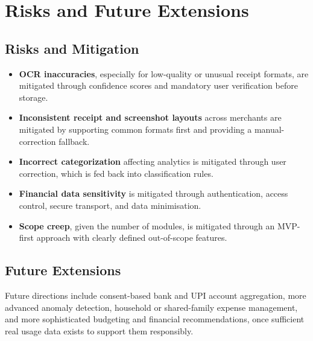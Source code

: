 \documentclass[11pt,a4paper]{article}
\begin{document}

\section{Risks and Future Extensions}

\subsection{Risks and Mitigation}

\begin{itemize}

    \item \textbf{OCR inaccuracies}, especially for low-quality or
    unusual receipt formats, are mitigated through confidence scores and
    mandatory user verification before storage.

    \item \textbf{Inconsistent receipt and screenshot layouts} across
    merchants are mitigated by supporting common formats first and
    providing a manual-correction fallback.

    \item \textbf{Incorrect categorization} affecting analytics is
    mitigated through user correction, which is fed back into
    classification rules.

    \item \textbf{Financial data sensitivity} is mitigated through
    authentication, access control, secure transport, and data
    minimisation.

    \item \textbf{Scope creep}, given the number of modules, is
    mitigated through an MVP-first approach with clearly defined
    out-of-scope features.

\end{itemize}

\subsection{Future Extensions}

Future directions include consent-based bank and UPI account aggregation,
more advanced anomaly detection, household or shared-family expense
management, and more sophisticated budgeting and financial
recommendations, once sufficient real usage data exists to support them
responsibly.
\end{document}
